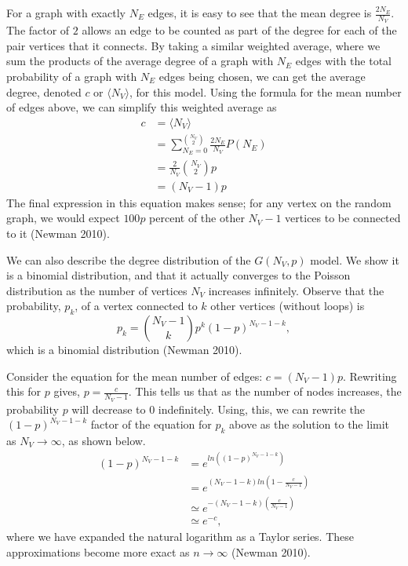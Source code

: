 \documentclass[12pt,twoside]{amherstthesis}
\begin{document}
  For a graph with exactly \(N_{E}\) edges, it is easy to see that the
  mean degree is \(\frac {2N_{E}} {N_{V}}\). The factor of \(2\) allows an
  edge to be counted as part of the degree for each of the pair vertices
  that it connects. By taking a similar weighted average, where we sum the
  products of the average degree of a graph with \(N_E\) edges with the
  total probability of a graph with \(N_E\) edges being chosen, we can get
  the average degree, denoted \(c\) or \(\langle N_{V} \rangle\), for this
  model. Using the formula for the mean number of edges above, we can
  simplify this weighted average as \[
  \begin{aligned}
  c &= \langle N_{V} \rangle \\
  &= \sum_{N_{E}=0}^{{N_{V} \choose 2}} \frac {2N_{E}} {N_{V}} P(N_{E}) \\
  &= \frac {2} {N_{V}} {N_{V} \choose 2}p \\
  &= (N_{V} - 1)p
  \end{aligned}
  \] The final expression in this equation makes sense; for any vertex on
  the random graph, we would expect \(100p\) percent of the other
  \(N_{V} - 1\) vertices to be connected to it (Newman 2010).
  
  We can also describe the degree distribution of the \(G(N_V, p)\) model.
  We show it is a binomial distribution, and that it actually converges to
  the Poisson distribution as the number of vertices \(N_{V}\) increases
  infinitely. Observe that the probability, \(p_k\), of a vertex connected
  to \(k\) other vertices (without loops) is
  \[p_{k} = {N_{V} -1 \choose k}p^{k}(1 - p)^{N_{V} - 1 - k},\] which is a
  binomial distribution (Newman 2010).
  
  Consider the equation for the mean number of edges:
  \(c = (N_{V} - 1)p\). Rewriting this for \(p\) gives,
  \(p = \frac {c} {N_{V} - 1}\). This tells us that as the number of nodes
  increases, the probability \(p\) will decrease to \(0\) indefinitely.
  Using, this, we can rewrite the \((1 - p)^{N_{V} - 1 - k}\) factor of
  the equation for \(p_{k}\) above as the solution to the limit as
  \(N_{V} \to \infty\), as shown below. \[
  \begin{aligned}
  (1 - p)^{N_{V} - 1 - k} &= e^{ln((1 - p)^{N_{V} - 1 - k})} \\
  &= e^{(N_{V} - 1 - k) ln(1 - \frac {c} {N_{V} - 1})} \\
  &\simeq e^{-(N_{V} - 1 - k)(\frac {c} {N_{V} - 1})} \\
  &\simeq e^{-c},
  \end{aligned}
  \] where we have expanded the natural logarithm as a Taylor series.
  These approximations become more exact as \(n \to \infty\) (Newman
  2010).
  
\end{document}
